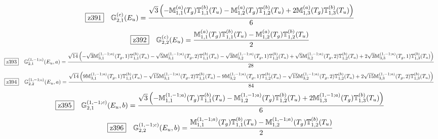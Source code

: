 \documentclass[fleqn,10pt,landscape]{jsarticle}
\begin{document}
\begin{dmath*}
\hspace*{3mm}\fbox{z391}\quad \mathbb{G}_{2,1}^{(c)}(E_{u})=\frac{\sqrt{3} \left(- \mathbb{M}_{1,1}^{(a)}(T_{g}) \mathbb{T}_{1,1}^{(b)}(T_{u}) - \mathbb{M}_{1,2}^{(a)}(T_{g}) \mathbb{T}_{1,2}^{(b)}(T_{u}) + 2 \mathbb{M}_{1,3}^{(a)}(T_{g}) \mathbb{T}_{1,3}^{(b)}(T_{u})\right)}{6}
\end{dmath*}
\begin{dmath*}
\hspace*{3mm}\fbox{z392}\quad \mathbb{G}_{2,2}^{(c)}(E_{u})=\frac{\mathbb{M}_{1,1}^{(a)}(T_{g}) \mathbb{T}_{1,1}^{(b)}(T_{u}) - \mathbb{M}_{1,2}^{(a)}(T_{g}) \mathbb{T}_{1,2}^{(b)}(T_{u})}{2}
\end{dmath*}
\begin{dmath*}
\hspace*{3mm}\fbox{z393}\quad \mathbb{G}_{2,1}^{(1,-1;c)}(E_{u},a)=\frac{\sqrt{14} \left(- \sqrt{3} \mathbb{M}_{3,1}^{(1,-1;a)}(T_{g},1) \mathbb{T}_{1,1}^{(b)}(T_{u}) - \sqrt{5} \mathbb{M}_{3,1}^{(1,-1;a)}(T_{g},2) \mathbb{T}_{1,1}^{(b)}(T_{u}) - \sqrt{3} \mathbb{M}_{3,2}^{(1,-1;a)}(T_{g},1) \mathbb{T}_{1,2}^{(b)}(T_{u}) + \sqrt{5} \mathbb{M}_{3,2}^{(1,-1;a)}(T_{g},2) \mathbb{T}_{1,2}^{(b)}(T_{u}) + 2 \sqrt{3} \mathbb{M}_{3,3}^{(1,-1;a)}(T_{g},1) \mathbb{T}_{1,3}^{(b)}(T_{u})\right)}{28}
\end{dmath*}
\begin{dmath*}
\hspace*{3mm}\fbox{z394}\quad \mathbb{G}_{2,2}^{(1,-1;c)}(E_{u},a)=\frac{\sqrt{14} \left(9 \mathbb{M}_{3,1}^{(1,-1;a)}(T_{g},1) \mathbb{T}_{1,1}^{(b)}(T_{u}) - \sqrt{15} \mathbb{M}_{3,1}^{(1,-1;a)}(T_{g},2) \mathbb{T}_{1,1}^{(b)}(T_{u}) - 9 \mathbb{M}_{3,2}^{(1,-1;a)}(T_{g},1) \mathbb{T}_{1,2}^{(b)}(T_{u}) - \sqrt{15} \mathbb{M}_{3,2}^{(1,-1;a)}(T_{g},2) \mathbb{T}_{1,2}^{(b)}(T_{u}) + 2 \sqrt{15} \mathbb{M}_{3,3}^{(1,-1;a)}(T_{g},2) \mathbb{T}_{1,3}^{(b)}(T_{u})\right)}{84}
\end{dmath*}
\begin{dmath*}
\hspace*{3mm}\fbox{z395}\quad \mathbb{G}_{2,1}^{(1,-1;c)}(E_{u},b)=\frac{\sqrt{3} \left(- \mathbb{M}_{1,1}^{(1,-1;a)}(T_{g}) \mathbb{T}_{1,1}^{(b)}(T_{u}) - \mathbb{M}_{1,2}^{(1,-1;a)}(T_{g}) \mathbb{T}_{1,2}^{(b)}(T_{u}) + 2 \mathbb{M}_{1,3}^{(1,-1;a)}(T_{g}) \mathbb{T}_{1,3}^{(b)}(T_{u})\right)}{6}
\end{dmath*}
\begin{dmath*}
\hspace*{3mm}\fbox{z396}\quad \mathbb{G}_{2,2}^{(1,-1;c)}(E_{u},b)=\frac{\mathbb{M}_{1,1}^{(1,-1;a)}(T_{g}) \mathbb{T}_{1,1}^{(b)}(T_{u}) - \mathbb{M}_{1,2}^{(1,-1;a)}(T_{g}) \mathbb{T}_{1,2}^{(b)}(T_{u})}{2}
\end{dmath*}
\end{document}

